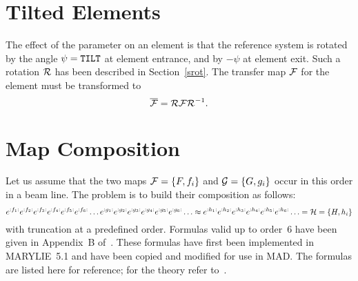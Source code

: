  
\section{Tilted Elements}
The effect of the  parameter on an element is that the 
reference system is rotated by the angle $\psi = {\tt TILT}$ at element
entrance, and by $-\psi$ at element exit.
Such a rotation ${\cal R}$ has been described in Section~\ref{srot}.
The transfer map ${\cal F}$ for the element must be transformed to
\begin{equation}
\overline{\cal F} = {\cal R \cal F \cal R}^{-1}.
\end{equation}
 
 
\section{Map Composition}
Let us assume that the two maps ${\cal F} = \{F, f_i\}$ and
${\cal G} = \{G, g_i\}$ occur in this order in a beam line.
The problem is to build their composition as follows:
\begin{equation}
e^{{:}{f_1}{:}} e^{{:}{f_2}{:}} e^{{:}{f_3}{:}} e^{{:}{f_4}{:}} e^{{:}{f_5}{:}}
e^{{:}{f_6}{:}} \ldots
e^{{:}{g_1}{:}} e^{{:}{g_2}{:}} e^{{:}{g_3}{:}} e^{{:}{g_4}{:}} e^{{:}{g_5}{:}}
e^{{:}{g_6}{:}} \ldots\approx
e^{{:}{h_1}{:}} e^{{:}{h_2}{:}} e^{{:}{h_3}{:}} e^{{:}{h_4}{:}} e^{{:}{h_5}{:}}
e^{{:}{h_6}{:}} \ldots = {\cal H} = \{H, h_i\}
\end{equation}
with truncation at a predefined order.
Formulas valid up to order~$6$ have been given in Appendix~B
of~\cite{HEA88}.
These formulas have first been implemented in MARYLIE~5.1 and have
been copied and modified for use in MAD.
The formulas are listed here for reference;
for the theory refer to~\cite{HEA88}.
 
